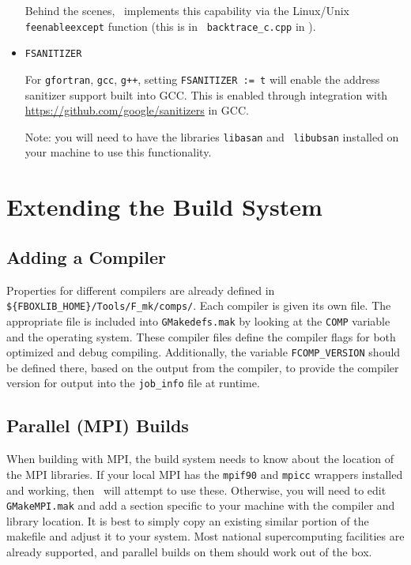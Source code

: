 \begin{itemize}
  Behind the scenes, \fboxlib\ implements this capability via the
  Linux/Unix {\tt feenableexcept} function (this is in {\tt
    backtrace\_c.cpp} in \fboxlib).

\item {\tt FSANITIZER}

  For {\tt gfortran}, {\tt gcc}, {\tt g++}, setting {\tt FSANITIZER :=
    t} will enable the
  address sanitizer support built into GCC.  This is enabled through
  integration with \url{https://github.com/google/sanitizers} in GCC.

  Note: you will need to have the libraries {\tt libasan} and {\tt
    libubsan} installed on your machine to use this functionality.

\end{itemize}


\section{Extending the Build System}

\subsection{Adding a Compiler}

Properties for different compilers are already defined in {\tt
  \$\{FBOXLIB\_HOME\}/Tools/F\_mk/comps/}.  Each compiler is given its
own file.  The appropriate file is included into {\tt GMakedefs.mak}
by looking at the {\tt COMP} variable and the operating system.  These
compiler files define the compiler flags for both optimized and debug
compiling.  Additionally, the variable {\tt FCOMP\_VERSION} should be
defined there, based on the output from the compiler, to provide the
compiler version for output into the {\tt job\_info} file at runtime.


\subsection{Parallel (MPI) Builds}

When building with MPI, the build system needs to know about the
location of the MPI libraries.  If your local MPI has the {\tt mpif90}
and {\tt mpicc} wrappers installed and working, then \maestro\ will
attempt to use these.  Otherwise, you will need to edit {\tt
  GMakeMPI.mak} and add a section specific to your machine with the
compiler and library location.  It is best to simply copy an existing
similar portion of the makefile and adjust it to your system.  Most
national supercomputing facilities are already supported, and parallel
builds on them should work out of the box.



